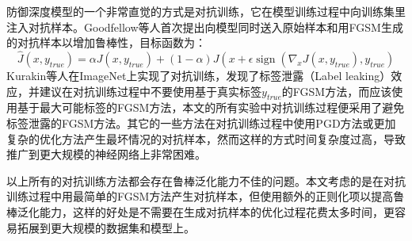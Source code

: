 防御深度模型的一个非常直觉的方式是对抗训练，它在模型训练过程中向训练集里注入对抗样本。Goodfellow等人首次提出向模型同时送入原始样本和用FGSM生成的对抗样本以增加鲁棒性\cite{goodfellow2014explaining}，目标函数为：
\begin{equation}
    \hat{J}\left(x, y_{t r u e}\right)=\alpha J\left(x, y_{t r u e}\right)+(1-\alpha) J\left(x+\epsilon \operatorname{sign}\left(\nabla_{x} J\left(x, y_{t r u e}\right), y_{t r u e}\right)\right.
\end{equation}
Kurakin等人在ImageNet上实现了对抗训练，发现了标签泄露（Label leaking）效应，并建议在对抗训练过程中不要使用基于真实标签$y_{true}$的FGSM方法，而应该使用基于最大可能标签的FGSM方法\cite{kurakin2017adversarial}，本文的所有实验中对抗训练过程便采用了避免标签泄露的FGSM方法。其它的一些方法在对抗训练过程中使用PGD方法或更加复杂的优化方法产生最坏情况的对抗样本，然而这样的方式时间复杂度过高，导致推广到更大规模的神经网络上非常困难\cite{madry2018towards, pmlr-v80-wong18a}。

以上所有的对抗训练方法都会存在鲁棒泛化能力不佳的问题。本文考虑的是在对抗训练过程中用最简单的FGSM方法产生对抗样本，但使用额外的正则化项以提高鲁棒泛化能力，这样的好处是不需要在生成对抗样本的优化过程花费太多时间，更容易拓展到更大规模的数据集和模型上。
